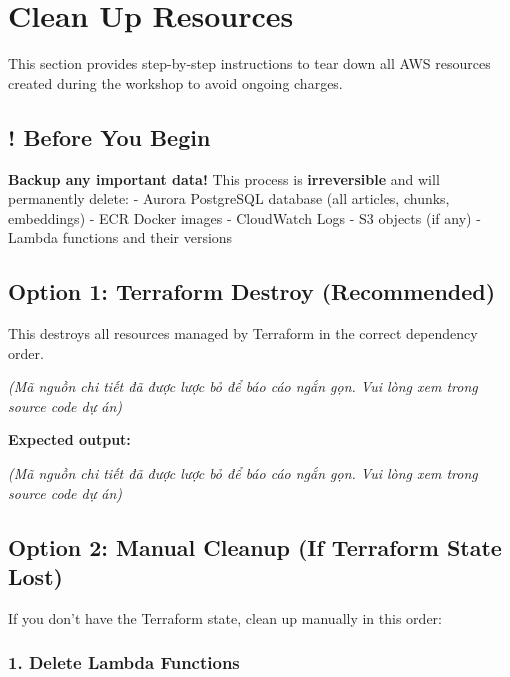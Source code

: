 \hypertarget{clean-up-resources}{%
\section{Clean Up Resources}}

This section provides step-by-step instructions to tear down all AWS
resources created during the workshop to avoid ongoing charges.

\hypertarget{before-you-begin}{%
\subsection{! Before You Begin}}

\textbf{Backup any important data!} This process is
\textbf{irreversible} and will permanently delete: - Aurora PostgreSQL
database (all articles, chunks, embeddings) - ECR Docker images -
CloudWatch Logs - S3 objects (if any) - Lambda functions and their
versions

\hypertarget{option-1-terraform-destroy-recommended}{%
\subsection{Option 1: Terraform Destroy
(Recommended)}}

This destroys all resources managed by Terraform in the correct
dependency order.

\emph{(Mã nguồn chi tiết đã được lược bỏ để báo cáo ngắn gọn. Vui lòng
xem trong source code dự án)}

\textbf{Expected output:}

\emph{(Mã nguồn chi tiết đã được lược bỏ để báo cáo ngắn gọn. Vui lòng
xem trong source code dự án)}

\hypertarget{option-2-manual-cleanup-if-terraform-state-lost}{%
\subsection{Option 2: Manual Cleanup (If Terraform State
Lost)}}

If you don't have the Terraform state, clean up manually in this order:

\hypertarget{delete-lambda-functions}{%
\subsubsection{1. Delete Lambda
Functions}}

\begin{Shaded}
\begin{Highlighting}[]
\end{Highlighting}
\end{Shaded}

